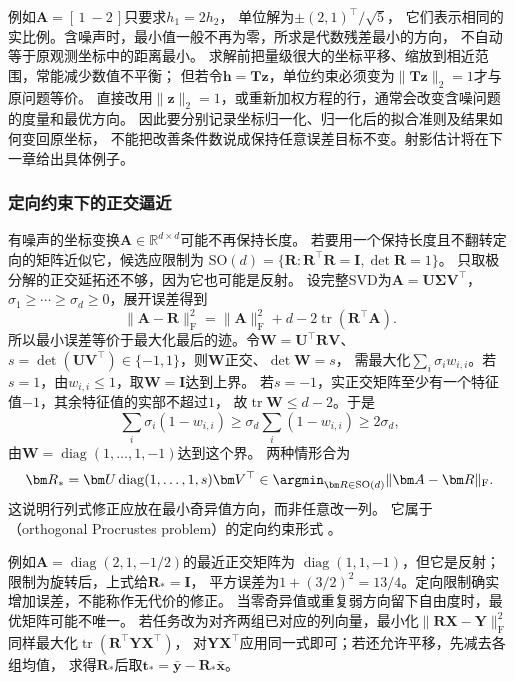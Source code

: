 例如$\bm A=[\,1\ -2\,]$只要求$h_1=2h_2$，
单位解为$\mathord\pm(2,1)^\top/\sqrt5$，
它们表示相同的实比例。含噪声时，最小值一般不再为零，所求是代数残差最小的方向，
不自动等于原观测坐标中的距离最小。
求解前把量级很大的坐标平移、缩放到相近范围，常能减少数值不平衡；
但若令$\bm h=\bm T\bm z$，单位约束必须变为$\|\bm T\bm z\|_2=1$才与原问题等价。
直接改用$\|\bm z\|_2=1$，或重新加权方程的行，通常会改变含噪问题的度量和最优方向。
因此要分别记录坐标归一化、归一化后的拟合准则及结果如何变回原坐标，
不能把改善条件数说成保持任意误差目标不变。射影估计将在下一章给出具体例子。

\subsubsection{定向约束下的正交逼近}
\label{sec:linear-algebra-orthogonal-procrustes}
有噪声的坐标变换$\bm A\in\mathbb R^{d\times d}$可能不再保持长度。
若要用一个保持长度且不翻转定向的矩阵近似它，候选应限制为
$\mathrm{SO}(d)=\{\bm R:\bm R^\top\bm R=\bm I,\det\bm R=1\}$。
只取极分解的正交延拓还不够，因为它也可能是反射。
设完整SVD为$\bm A=\bm U\bm\Sigma\bm V^\top$，
$\sigma_1\geq\cdots\geq\sigma_d\geq0$，展开误差得到
\[
 \|\bm A-\bm R\|_{\mathrm F}^2
 =\|\bm A\|_{\mathrm F}^2+d-2\operatorname{tr}(\bm R^\top\bm A).
\]
所以最小误差等价于最大化最后的迹。令$\bm W=\bm U^\top\bm R\bm V$、
$s=\det(\bm U\bm V^\top)\in\{-1,1\}$，则$\bm W$正交、$\det\bm W=s$，
需最大化$\sum_i\sigma_i w_{i,i}$。若$s=1$，由$w_{i,i}\leq1$，取$\bm W=\bm I$达到上界。
若$s=-1$，实正交矩阵至少有一个特征值$-1$，其余特征值的实部不超过$1$，
故$\operatorname{tr}\bm W\leq d-2$。于是
\[
 \sum_i\sigma_i(1-w_{i,i})
 \geq\sigma_d\sum_i(1-w_{i,i})\geq2\sigma_d,
\]
由$\bm W=\operatorname{diag}(1,\ldots,1,-1)$达到这个界。
两种情形合为
\begin{equation}
 \bm R_*
 =\bm U\operatorname{diag}(1,\ldots,1,s)\bm V^\top
 \in\argmin_{\bm R\in\mathrm{SO}(d)}\|\bm A-\bm R\|_{\mathrm F}.
 \label{eq:linear-algebra-nearest-rotation}
\end{equation}
这说明行列式修正应放在最小奇异值方向，而非任意改一列。
它属于（orthogonal Procrustes problem）的定向约束形式
。

例如$\bm A=\operatorname{diag}(2,1,-1/2)$的最近正交矩阵为
$\operatorname{diag}(1,1,-1)$，但它是反射；限制为旋转后，上式给$\bm R_*=\bm I$，
平方误差为$1+(3/2)^2=13/4$。定向限制确实增加误差，不能称作无代价的修正。
当零奇异值或重复弱方向留下自由度时，最优矩阵可能不唯一。
若任务改为对齐两组已对应的列向量，最小化$\|\bm R\bm X-\bm Y\|_{\mathrm F}^2$
同样最大化$\operatorname{tr}(\bm R^\top\bm Y\bm X^\top)$，
对$\bm Y\bm X^\top$应用同一式即可；若还允许平移，先减去各组均值，
求得$\bm R_*$后取$\bm t_*=\bar{\bm y}-\bm R_*\bar{\bm x}$。

